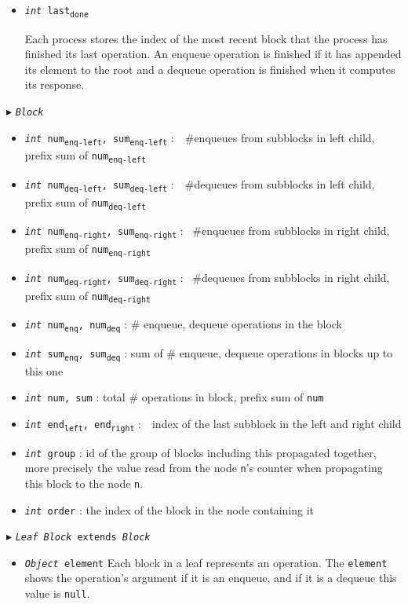 \documentclass[10pt]{article}
\newcommand{\sub}[1]{\textsubscript{#1}}
\renewcommand{\tt}[1]{\texttt{#1}}
\renewcommand{\sl}[1]{\textsl{#1}}
\theoremstyle{definition}
\begin{document}
\begin{algorithm}
\begin{algorithmic}[1]
\begin{multicols}{2}
\begin{itemize}
  \item \tt{\sl{int} \tt{last\sub{done}}}

  \textsf{Each process stores the index of the most recent block that the process has finished its last operation. An enqueue operation is finished if it has appended its element to the root and a dequeue operation is finished when it computes its response.}
  
\end{itemize}


\Statex $\blacktriangleright$ \tt{\sl{Block}}

\begin{itemize}
  \item \tt{\sl{int} num\sub{enq-left}, sum\sub{enq-left}}
  \textsf{:~~\#enqueues from subblocks in left child, prefix sum of \tt{num\sub{enq-left}}}
  \item \tt{\sl{int} num\sub{deq-left}, sum\sub{deq-left}}
  \textsf{:~~\#dequeues from subblocks in left child, prefix sum of \tt{num\sub{deq-left}}}
  \item \tt{\sl{int} num\sub{enq-right}, \tt{sum\sub{enq-right}}}
  \textsf{: ~\#enqueues from subblocks in right child, prefix sum of \tt{num\sub{enq-right}}}
  \item \tt{\sl{int} num\sub{deq-right}, \tt{sum\sub{deq-right}}}
  \textsf{: ~\#dequeues from subblocks in right child, prefix sum of \tt{num\sub{deq-right}}}
  \item \tt{\sl{int} num\sub{enq}, num\sub{deq}}
  \textsf{: \# enqueue, dequeue operations in the block}
  \item \tt{\sl{int} sum\sub{enq}, sum\sub{deq}}
  \textsf{: sum of \# enqueue, dequeue operations in blocks up to this one}
  \item \tt{\sl{int} num, sum}
  \textsf{: total \# operations in block, prefix sum of \tt{num}}
  \item \tt{\sl{int} end\sub{left}, end\sub{right}}
  \textsf{:~~index of the last subblock in the left and right child}
  \item \tt{\sl{int} group}
  \textsf{: id of the group of blocks including this propagated together, more precisely the value read from the node \tt{n}'s counter when propagating this block to the node \tt{n}.}
  \item \tt{\sl{int} order}
  \textsf{: the index of the block in the node containing it}
\end{itemize}

\pagebreak

\Statex $\blacktriangleright$ \tt{\sl{Leaf Block} extends \sl{Block}}
\begin{itemize}
  \item \tt{\sl{Object} element}
  \textsf{Each block in a leaf represents an operation. The \tt{element} shows the operation's argument if it is an enqueue, and if it is a dequeue this value is \tt{null}.}
\end{itemize}


\end{multicols}
\end{algorithmic}
\end{algorithm}
\end{document}
